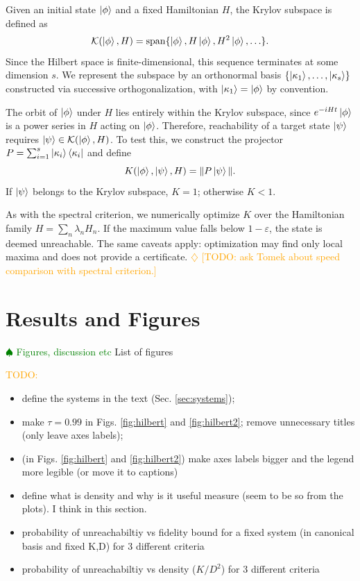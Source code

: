 \documentclass[aps,prx,reprint,superscriptaddress,footnote, twocolumn,notitlepage]{revtex4-2}
\newcommand{\tom}[1]{\textcolor{green}{#1}}
\newcommand{\ko}[1]{\textcolor{orange}{#1}}
\newcommand{\todotom}[1]{\tom{$\spadesuit$ #1}}
\newcommand{\todoko}[1]{\ko{$\diamondsuit$ #1}}
\begin{document}
Given an initial state $\ket{\phi}$ and a fixed Hamiltonian $H$, the Krylov subspace is defined as
\begin{equation}
    \mathcal{K}(\ket{\phi}, H) = \mathrm{span}\{\ket{\phi}, H\ket{\phi}, H^2\ket{\phi}, \ldots\}.
\end{equation}
Since the Hilbert space is finite-dimensional, this sequence terminates at some dimension $s$. We represent the subspace by an orthonormal basis $\{\ket{\kappa_1}, \ldots, \ket{\kappa_s}\}$ constructed via successive orthogonalization, with $\ket{\kappa_1} = \ket{\phi}$ by convention.

The orbit of $\ket{\phi}$ under $H$ lies entirely within the Krylov subspace, since $e^{-iHt}\ket{\phi}$ is a power series in $H$ acting on $\ket{\phi}$. Therefore, reachability of a target state $\ket{\psi}$ requires $\ket{\psi} \in \mathcal{K}(\ket{\phi}, H)$. To test this, we construct the projector $P = \sum_{i=1}^{s} \ket{\kappa_i}\bra{\kappa_i}$ and define
\begin{equation}
    K(\ket{\phi}, \ket{\psi}, H) = \| P \ket{\psi} \|.
\end{equation}
If $\ket{\psi}$ belongs to the Krylov subspace, $K = 1$; otherwise $K < 1$.

As with the spectral criterion, we numerically optimize $K$ over the Hamiltonian family $H = \sum_n \lambda_n H_n$. If the maximum value falls below $1 - \varepsilon$, the state is deemed unreachable. The same caveats apply: optimization may find only local maxima and does not provide a certificate. \todoko{[TODO: ask Tomek about speed comparison with spectral criterion.]}

\section{{Results and Figures}}
\todotom{Figures, discussion etc}
List of figures

\ko{TODO:}
\begin{itemize}
\item  define the systems in the text (Sec. \ref{sec:systems});
\item make $\tau=0.99$ in Figs. \ref{fig:hilbert} and \ref{fig:hilbert2}; remove unnecessary titles (only leave axes labels); 
\item (in Figs. \ref{fig:hilbert} and \ref{fig:hilbert2}) make axes labels bigger and the legend more legible (or move it to captions)
\item  define what is density and why is it useful measure (seem to be so from the plots). I think in this section.
\end{itemize}
\begin{itemize}
    \item probability of unreachabiltiy vs fidelity bound for a fixed system (in canonical basis and fixed K,D) for 3 different criteria
     \item probability of unreachabiltiy vs density ($K/D^2$) for 3 different criteria
\end{itemize}
\end{document}
